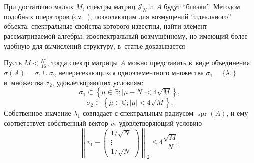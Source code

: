 При достаточно малых \( M \),
 спектры матриц \( \mathcal{J}_N \) и~\( A \) будут ``близки''.
Методом подобных операторов (см.~\cite{baskakov-harmonic,baskakov1983}),
 позволяющим для возмущений ``идеального'' объекта, спектральные свойства которого известны,
 найти элемент рассматриваемой алгебры, изоспектральный возмущ\"енному,
 но имеющий более удобную для вычислений структуру,
 в~статье доказывается
\begin{thm}\label{kozlukovsv:thm:almost-all-ones}
    Пусть \( M < \frac{N^2}{16} \),
    тогда спектр матрицы \( A \) можно представить в~виде
    объединения \( \sigma\left(A\right) = \sigma_1 \cup \sigma_2 \)
    непересекающихся
    одноэлементного множества \( \sigma_1=\{\lambda_1\} \)
    и~множества \( \sigma_2 \), удовлетворяющих условиям:
    \[ \sigma_1 \subset \left\{ \mu\in\mathbb{R}; \lvert \mu - N \rvert < 4\sqrt{M} \right\}, \]
    \[ \sigma_2 \subset \left\{ \mu\in\mathbb{C}; \lvert \mu \rvert < 4\sqrt{M} \right\}. \]
    Собственное значение \( \lambda_1 \) совпадает с спектральным радиусом
    \( \operatorname{spr}(A) \),
    и ему соответствует собственный вектор \( v_1 \)
    удовлетворяющий условию
    \[ \left\|v_1 - 
    \begin{pmatrix} 1/\sqrt{N}\\ \vdots \\ 1/\sqrt{N}\end{pmatrix}\right\|_2
        \leq 4\frac{\sqrt{M}}{N}. \]
\end{thm}
